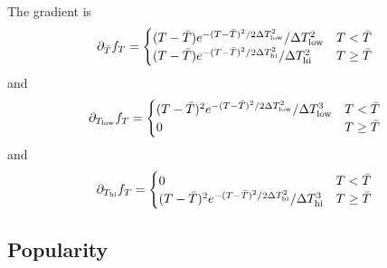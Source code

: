 \documentclass{article}
\newcommand{\bbeta}{\boldsymbol\beta}
\begin{document}
The gradient is
\[
\partial_{\bar{T}} f_T =
\begin{cases}
  (T - \bar{T})
    e^{-(T - \bar{T})^2 / 2 \Delta T_{\rm low}^2} / \Delta T_{\rm low}^2
    & T < \bar{T} \\
  (T - \bar{T})
    e^{-(T - \bar{T})^2 / 2 \Delta T_{\rm hi}^2} / \Delta T_{\rm hi}^2
    & T \geq \bar{T}
\end{cases}
\]
and
\[
\partial_{T_{\rm low}} f_T =
\begin{cases}
  (T - \bar{T})^2
    e^{-(T - \bar{T})^2 / 2 \Delta T_{\rm low}^2} /
    \Delta T_{\rm low}^3
    & T < \bar{T} \\
  0 & T \geq \bar{T}
\end{cases}
\]
and
\[
\partial_{T_{\rm hi}} f_T =
\begin{cases}
  0 & T < \bar{T} \\
  (T - \bar{T})^2
    e^{-(T - \bar{T})^2 / 2 \Delta T_{\rm hi}^2} / \Delta T_{\rm hi}^3
    & T \geq \bar{T}
\end{cases}
\]



\subsection*{Popularity}
\end{document}
